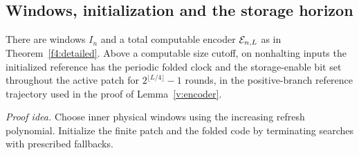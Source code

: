 \subsection{Windows, initialization and the storage horizon}\label{f4:positive}
\begin{lemma}\label{f4:encoder}
There are windows \(I_n\) and a total computable encoder \(\mathcal E_{n,L}\)
as in Theorem~\ref{f4:detailed}. Above a computable size cutoff, on
nonhalting inputs the initialized reference has the periodic folded
clock and the storage-enable bit set throughout the active patch for
\(2^{\lfloor L/4\rfloor}-1\) rounds, in the positive-branch reference
trajectory used in the proof of Lemma~\ref{v:encoder}.
\end{lemma}
\par\noindent\emph{Proof idea.} Choose inner physical windows using the increasing refresh polynomial. Initialize the finite patch and the folded code by terminating searches with prescribed fallbacks.


